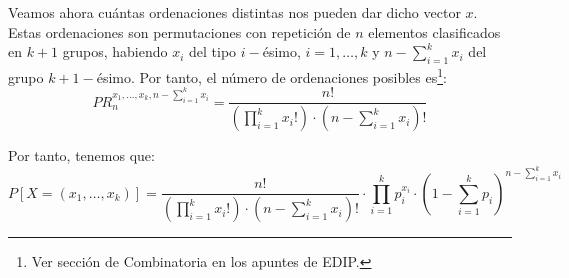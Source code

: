 Veamos ahora cuántas ordenaciones distintas nos pueden dar dicho vector $x$. Estas ordenaciones son permutaciones con repetición de $n$ elementos clasificados en $k+1$ grupos, habiendo $x_i$ del tipo $i-$ésimo, $i=1, \ldots, k$ y $n-\sum_{i=1}^k x_i$ del grupo $k+1-$ésimo. Por tanto, el número de ordenaciones posibles es\footnote{Ver sección de Combinatoria en los apuntes de EDIP.}:
\begin{equation*}
    PR_{n}^{x_1, \ldots, x_k, n-\sum_{i=1}^k x_i}=\dfrac{n!}{\left(\prod\limits_{i=1}^k x_i!\right) \cdot \left(n-\sum\limits_{i=1}^k x_i\right)!}
\end{equation*}

Por tanto, tenemos que:
\begin{equation*}
    P[X=(x_1,\dots,x_k)]=\dfrac{n!}{\left(\prod\limits_{i=1}^k x_i!\right)\cdot \left(n-\sum\limits_{i=1}^k x_i\right)!}\cdot \prod_{i=1}^{k} p_i^{x_i} \cdot \left(1-\sum_{i=1}^k p_i\right)^{n-\sum\limits_{i=1}^k x_i}
\end{equation*}

